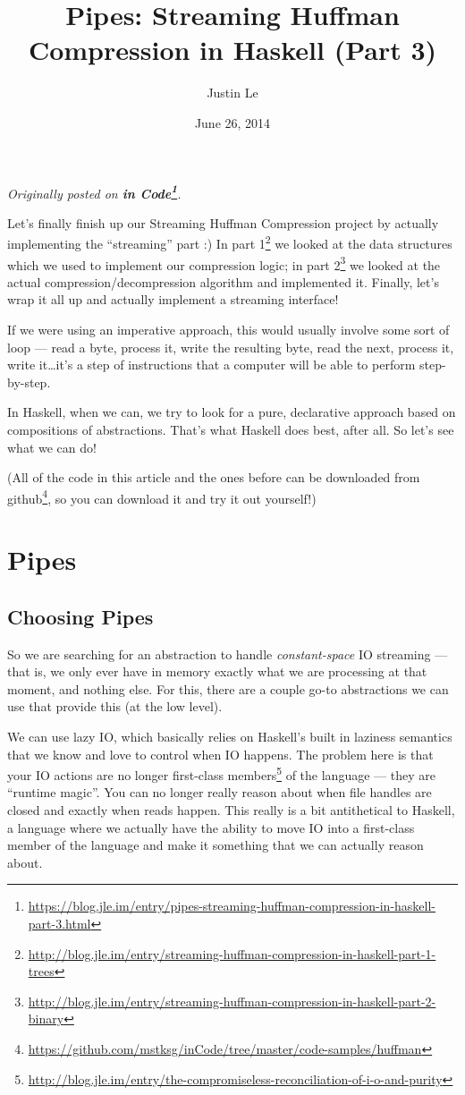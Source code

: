 \documentclass[]{article}
\title{Pipes: Streaming Huffman Compression in Haskell (Part 3)}
\author{Justin Le}
\date{June 26, 2014}
\renewcommand{\href}[2]{#2\footnote{\url{#1}}}
\begin{document}
\maketitle

\emph{Originally posted on
\textbf{\href{https://blog.jle.im/entry/pipes-streaming-huffman-compression-in-haskell-part-3.html}{in
Code}}.}

Let's finally finish up our Streaming Huffman Compression project by actually
implementing the ``streaming'' part :) In
\href{http://blog.jle.im/entry/streaming-huffman-compression-in-haskell-part-1-trees}{part
1} we looked at the data structures which we used to implement our compression
logic; in
\href{http://blog.jle.im/entry/streaming-huffman-compression-in-haskell-part-2-binary}{part
2} we looked at the actual compression/decompression algorithm and implemented
it. Finally, let's wrap it all up and actually implement a streaming interface!

If we were using an imperative approach, this would usually involve some sort of
loop --- read a byte, process it, write the resulting byte, read the next,
process it, write it\ldots{}it's a step of instructions that a computer will be
able to perform step-by-step.

In Haskell, when we can, we try to look for a pure, declarative approach based
on compositions of abstractions. That's what Haskell does best, after all. So
let's see what we can do!

(All of the code in this article and the ones before can be downloaded
\href{https://github.com/mstksg/inCode/tree/master/code-samples/huffman}{from
github}, so you can download it and try it out yourself!)

\section{Pipes}\label{pipes}

\subsection{Choosing Pipes}\label{choosing-pipes}

So we are searching for an abstraction to handle \emph{constant-space} IO
streaming --- that is, we only ever have in memory exactly what we are
processing at that moment, and nothing else. For this, there are a couple go-to
abstractions we can use that provide this (at the low level).

We can use lazy IO, which basically relies on Haskell's built in laziness
semantics that we know and love to control when IO happens. The problem here is
that your IO actions are no longer
\href{http://blog.jle.im/entry/the-compromiseless-reconciliation-of-i-o-and-purity}{first-class
members} of the language --- they are ``runtime magic''. You can no longer
really reason about when file handles are closed and exactly when reads happen.
This really is a bit antithetical to Haskell, a language where we actually have
the ability to move IO into a first-class member of the language and make it
something that we can actually reason about.
\end{document}
